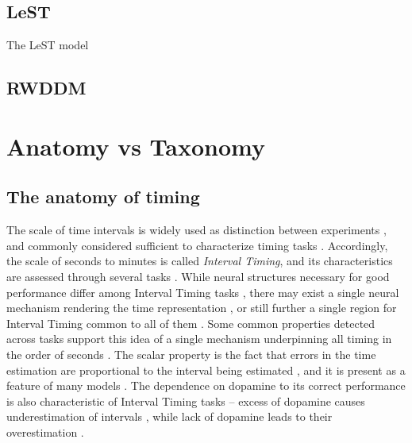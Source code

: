     \subsection{LeST}
        The LeST model 
    
    \subsection{RWDDM}
    


\section{Anatomy vs Taxonomy}
    \subsection{The anatomy of timing}
    \label{sub:anatomy}
    
        The scale of time intervals is widely used as distinction between experiments \cite{van20168, buhusi2005makes, hardy2016neurocomputational}, and commonly considered sufficient to characterize timing tasks \cite{buhusi2005makes}. Accordingly, the scale of seconds to minutes is called \textit{Interval Timing}, and its characteristics are assessed through several tasks \cite{lloyd2012neural,astrand2014comparison,brea2016prospective,mello2015scalable,gouvea2015striatal,kopec2018controlling,gershman2014dopamine,tiganj2016sequential,narayanan2009delay,cho2010differential}. While neural structures necessary for good performance differ among Interval Timing tasks \cite{paton2018neural}, there may exist a single neural mechanism rendering the time representation \cite{gibbon1977scalar}, or still further a single region for Interval Timing common to all of them \cite{mello2015scalable}. Some common properties detected across tasks support this idea of a single mechanism underpinning all timing in the order of seconds \cite{buhusi2005makes, gibbon1977scalar}. The scalar property is the fact that errors in the time estimation are  proportional to the interval being estimated \cite{oprisan2014all}, and it is present as a feature of many models \cite{gibbon1977scalar, oprisan2014all}. The dependence on dopamine to its correct performance is also characteristic of Interval Timing tasks \cite{kim2017optogenetic, meck2012gene} -- excess of dopamine causes underestimation of intervals \cite{cheng2016clock, pine2010dopamine}, while lack of dopamine leads to their overestimation \cite{drew2003effects}. 
        
